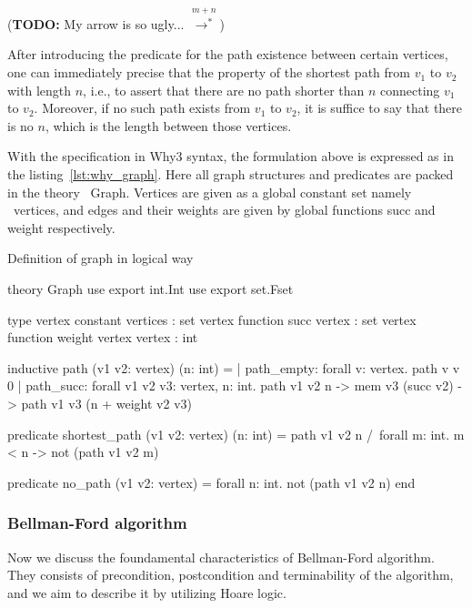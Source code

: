\documentclass[a4paper,12pt]{article}
\begin{document}
(\textbf{TODO:} My arrow is so ugly... $ \stackrel{m+n}{\longrightarrow^*} $)

After introducing the predicate for the path existence between certain
vertices, one can immediately precise that the property of the
shortest path from $ v_1 $ to $ v_2 $ with length $ n $, i.e., to
assert that there are no path shorter than $ n $ connecting $ v_1 $ to
$ v_2 $. Moreover, if no such path exists from $ v_1 $ to $ v_2 $, it
is suffice to say that there is no $ n $, which is the length between
those vertices.

With the specification in Why3 syntax, the formulation above is
expressed as in the listing~\ref{lst:why_graph}. Here all graph
structures and predicates are packed in the theory \mbox{\sc
  Graph}. Vertices are given as a global constant set namely \mbox{\sc
  vertices}, and edges and their weights are given by global functions
\mbox{\sc succ} and \mbox{\sc weight} respectively.

\begin{algorithm}
\caption{Definition of graph in logical way}\label{lst:why_graph}
\begin{why3}[1]
theory Graph
  use export int.Int
  use export set.Fset

  type vertex
  constant vertices : set vertex
  function succ vertex : set vertex
  function weight vertex vertex : int

  inductive path (v1 v2: vertex) (n: int) =
    | path_empty:
        forall v: vertex. path v v 0
    | path_succ:
        forall v1 v2 v3: vertex, n: int.
        path v1 v2 n -> mem v3 (succ v2) -> path v1 v3 (n + weight v2 v3)

  predicate shortest_path (v1 v2: vertex) (n: int) =
    path v1 v2 n /\
    forall m: int. m < n -> not (path v1 v2 m)

  predicate no_path (v1 v2: vertex) =
    forall n: int. not (path v1 v2 n)
end
\end{why3}
\end{algorithm}

\subsubsection{Bellman-Ford algorithm}

Now we discuss the foundamental characteristics of Bellman-Ford
algorithm. They consists of precondition, postcondition and
terminability of the algorithm, and we aim to describe it by utilizing
Hoare logic.
\end{document}
